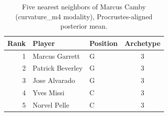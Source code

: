 \begin{table}[htbp]
  \centering\small
  \begin{tabular}{rllc}
    \toprule
    Rank & Player & Position & Archetype \\
    \midrule
    1 & Marcus Garrett & G & 3 \\
    2 & Patrick Beverley & G & 3 \\
    3 & Jose Alvarado & G & 3 \\
    4 & Yves Missi & C & 3 \\
    5 & Norvel Pelle & C & 3 \\
    \bottomrule
  \end{tabular}
  \caption{Five nearest neighbors of Marcus Camby (curvature_m4 modality), Procrustes-aligned posterior mean.}
  \label{tab:Marcus_Camby_neighbors_curvature_m4}
\end{table}

